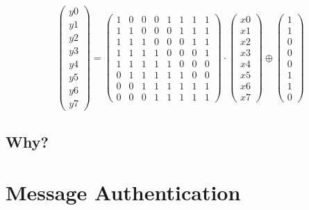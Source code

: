     \begin{equation}
        \begin{pmatrix}
            y0\\y1\\y2\\y3\\y4\\y5\\y6\\y7
        \end{pmatrix}
        =
        \begin{pmatrix}
            1&0&0&0&1&1&1&1\\
            1&1&0&0&0&1&1&1\\
            1&1&1&0&0&0&1&1\\
            1&1&1&1&0&0&0&1\\
            1&1&1&1&1&0&0&0\\
            0&1&1&1&1&1&0&0\\
            0&0&1&1&1&1&1&1\\
            0&0&0&1&1&1&1&1
        \end{pmatrix}
        \cdot
        \begin{pmatrix}
            x0\\x1\\x2\\x3\\x4\\x5\\x6\\x7
        \end{pmatrix}
        \oplus
        \begin{pmatrix}
            1\\1\\0\\0\\0\\1\\1\\0
        \end{pmatrix}
    \end{equation}
    
    \subsection{Why?}
    
\section{Message Authentication}
